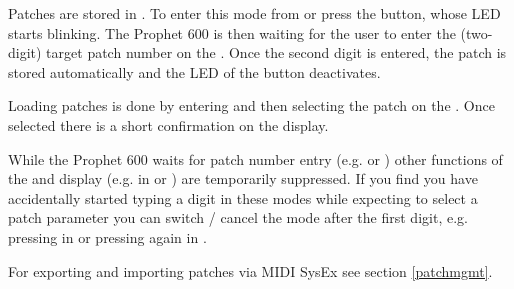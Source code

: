 Patches are stored in \storagemode. To enter this mode from \presetmode or \livemode press the \record button, whose LED starts blinking. The Prophet 600 is then waiting for the user to enter the (two-digit) target patch number on the \termnumberpad. Once the second digit is entered, the patch is stored automatically and the LED of the \record button deactivates. 

Loading patches is done by entering \presetpatch and then selecting the patch on the \termnumberpad. Once selected there is a short confirmation on the display.

While the Prophet 600 waits for patch number entry (e.g. \storagemode or \presetpatch) other functions of the \termnumberpad and display (e.g. in \presetpanel or \livemode) are temporarily suppressed. If you find you have accidentally started typing a digit in these modes while expecting to select a patch parameter you can switch / cancel the mode after the first digit, e.g. pressing \totape in \presetpatch or pressing \record again in \storagemode.

For exporting and importing patches via MIDI SysEx see section \ref{patchmgmt}.
